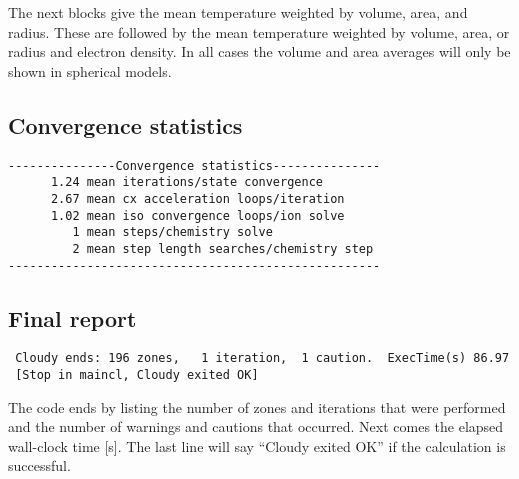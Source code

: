 The next blocks give the mean temperature weighted by volume, area, and radius.
These are followed by the mean temperature weighted by volume, area, or radius and
electron density. In all cases the volume and area averages will only be shown in
spherical models.

\subsection{Convergence statistics}
{\setverbatimfontsize{\tiny}
\begin{verbatim}
---------------Convergence statistics---------------
      1.24 mean iterations/state convergence
      2.67 mean cx acceleration loops/iteration
      1.02 mean iso convergence loops/ion solve
         1 mean steps/chemistry solve
         2 mean step length searches/chemistry step
----------------------------------------------------
\end{verbatim}
}

\subsection{Final report}
{\setverbatimfontsize{\tiny}
\begin{verbatim}
 Cloudy ends: 196 zones,   1 iteration,  1 caution.  ExecTime(s) 86.97
 [Stop in maincl, Cloudy exited OK]
\end{verbatim}
}

The code ends by listing the number of zones and iterations that were
performed and the number of warnings and cautions that occurred.
Next comes
the elapsed wall-clock time [s].
The last line will say ``Cloudy exited
OK'' if the calculation is successful.

